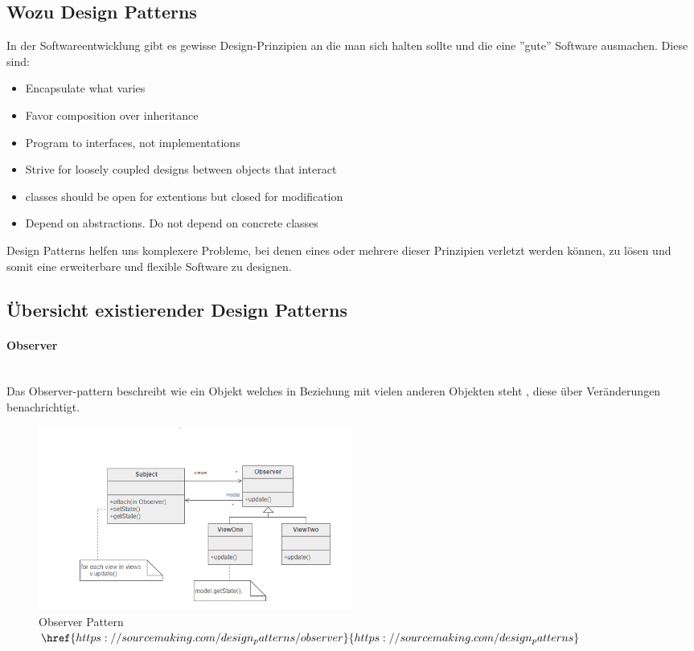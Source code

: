 \subsection{Wozu Design Patterns}
In der Softwareentwicklung gibt es gewisse Design-Prinzipien an die man sich halten sollte und die eine ''gute'' Software ausmachen. Diese sind:
\begin{itemize}
	\item Encapsulate what varies
	\item Favor composition over inheritance
	\item Program to interfaces, not implementations
	\item Strive for loosely coupled designs between objects that interact
	\item classes should be open for extentions but closed for modification 
	\item Depend on abstractions. Do not depend on concrete classes
\end{itemize}

Design Patterns helfen uns komplexere Probleme, bei denen eines oder mehrere dieser Prinzipien verletzt werden können, zu lösen und somit eine erweiterbare und flexible Software zu designen.
\clearpage 
\subsection{Übersicht existierender Design Patterns}
	\paragraph{Observer}~\\
Das Observer-pattern beschreibt wie ein Objekt welches in Beziehung mit vielen anderen Objekten steht , diese über Veränderungen benachrichtigt.
	\begin{figure}[H]
		\centering
		\includegraphics[width=0.5\textwidth]{images/Observer.png}
		\caption{Observer Pattern \\ $\href{https://sourcemaking.com/design_patterns/observer}{https://sourcemaking.com/design_patterns}$}
	\end{figure}
